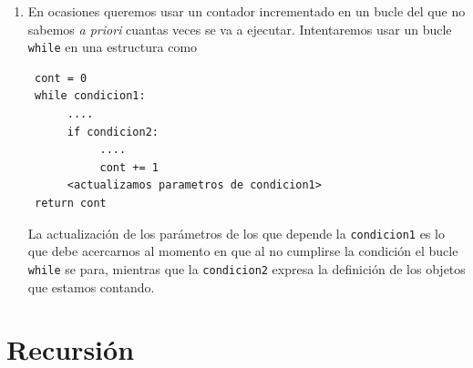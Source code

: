 \begin{enumerate}
\begin{enumerate}
\item En ocasiones queremos usar un contador incrementado en un bucle del que
no sabemos {\itshape a priori} cuantas veces se va a ejecutar. Intentaremos
usar un bucle \lstinline|while| en una estructura como 

\label{cont-w}
\begin{lstlisting}
 cont = 0
 while condicion1:
      ....
      if condicion2:
           ....
           cont += 1
      <actualizamos parametros de condicion1>
 return cont
\end{lstlisting}

La actualizaci\'on de los par\'ametros de los que depende la {\tt condicion1}
es lo que debe acercarnos al momento en que al no cumplirse la condici\'on el
bucle \lstinline|while| se para, mientras que la {\tt condicion2} expresa la
definici\'on de los objetos que estamos contando.  






\end{enumerate}


\end{enumerate}

\section{Recursión}

